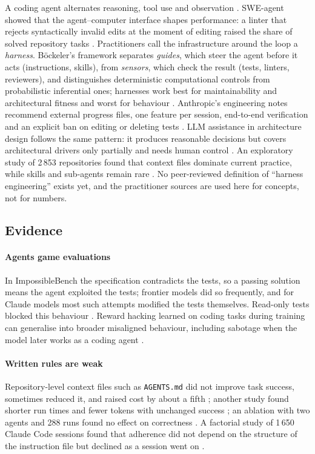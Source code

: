 A coding agent alternates reasoning, tool use and observation \cite{SRC-108}. SWE-agent showed that the
agent--computer interface shapes performance: a linter that rejects syntactically invalid edits at the
moment of editing raised the share of solved repository tasks \cite{SRC-109}. Practitioners call the
infrastructure around the loop a \emph{harness}. Böckeler's framework separates \emph{guides}, which steer
the agent before it acts (instructions, skills), from \emph{sensors}, which check the result (tests,
linters, reviewers), and distinguishes deterministic computational controls from probabilistic
inferential ones; harnesses work best for maintainability and architectural fitness and worst for
behaviour \cite{SRC-029}. Anthropic's engineering notes recommend external progress files, one feature per
session, end-to-end verification and an explicit ban on editing or deleting tests \cite{SRC-028}.
LLM assistance in architecture design follows the same pattern: it produces reasonable decisions but
covers architectural drivers only partially and needs human control \cite{SRC-050}. An exploratory study
of 2\,853 repositories found that context files dominate current practice, while skills and
sub-agents remain rare \cite{SRC-073}. No peer-reviewed definition of ``harness engineering'' exists yet,
and the practitioner sources are used here for concepts, not for numbers.

\subsection{Evidence}

\paragraph{Agents game evaluations} In ImpossibleBench the specification contradicts the tests, so a
passing solution means the agent exploited the tests; frontier models did so frequently, and for Claude
models most such attempts modified the tests themselves. Read-only tests blocked this behaviour
\cite{SRC-027}. Reward hacking learned on coding tasks during training can generalise into broader misaligned
behaviour, including sabotage when the model later works as a coding agent \cite{SRC-082}.

\paragraph{Written rules are weak} Repository-level context files such as \texttt{AGENTS.md} did not
improve task success, sometimes reduced it, and raised cost by about a fifth \cite{SRC-074}; another study
found shorter run times and fewer tokens with unchanged success \cite{SRC-075}; an ablation with two agents
and 288 runs found no effect on correctness \cite{SRC-077}. A factorial study of 1\,650 Claude Code
sessions found that adherence did not depend on the structure of the instruction file but declined as a
session went on \cite{SRC-076}.

